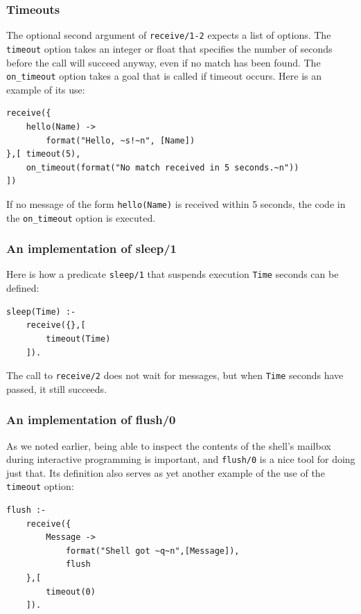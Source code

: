 \subsubsection{Timeouts}

\noindent The optional second argument of \texttt{receive/1-2} expects a list of options. The \texttt{timeout} option takes an integer or float that specifies the number of seconds before the call will succeed anyway, even if no match has been found. The \texttt{on\_timeout} option takes a goal that is called if timeout occurs. Here is an example of its use:

\begin{verbatim}
receive({
    hello(Name) ->
        format("Hello, ~s!~n", [Name])
},[ timeout(5),
    on_timeout(format("No match received in 5 seconds.~n"))
])
\end{verbatim}

\noindent If no message of the form \texttt{hello(Name)} is received within 5 seconds, the code in the \texttt{on\_timeout} option is executed.


\subsubsection{An implementation of sleep/1}

Here is how a predicate \texttt{sleep/1} that suspends execution \texttt{Time} seconds can be defined:

\begin{verbatim}
sleep(Time) :-
    receive({},[ 
        timeout(Time)
    ]).
\end{verbatim}

\noindent The call to \texttt{receive/2} does not wait for messages, but when \texttt{Time} seconds have passed, it still succeeds.

\subsubsection{An implementation of flush/0}

As we noted earlier, being able to inspect the contents of the shell's mailbox during interactive programming is important, and \texttt{flush/0} is a nice tool for doing just that. Its definition also serves as yet another example of the use of the \texttt{timeout} option:

\begin{verbatim}
flush :-
    receive({
        Message -> 
            format("Shell got ~q~n",[Message]),
            flush
    },[ 
        timeout(0)
    ]).
\end{verbatim}

